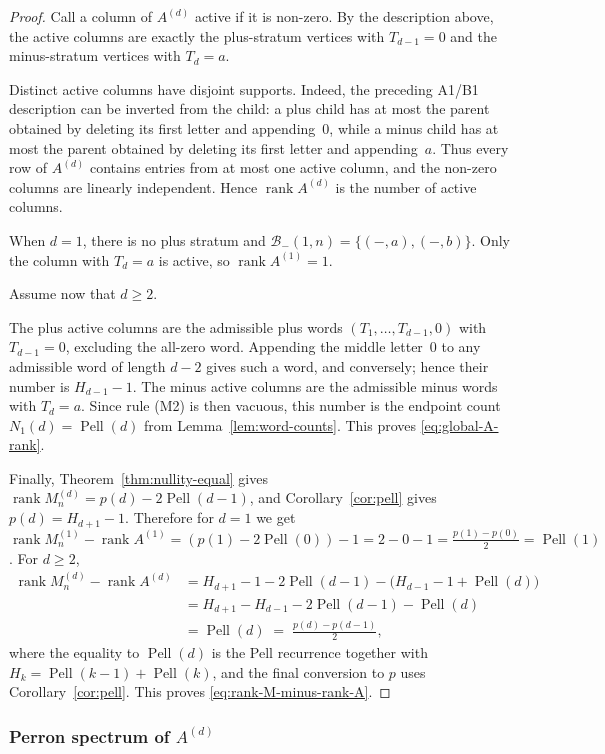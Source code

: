 \documentclass{amsart}
\theoremstyle{definition}
\theoremstyle{remark}
\DeclareMathOperator{\rank}{rank}
\DeclareMathOperator{\Pell}{Pell}
\begin{document}
\begin{proof}
Call a column of $A^{(d)}$ active if it is non-zero.  By the
description above, the active columns are exactly the plus-stratum
vertices with $T_{d-1}=0$ and the minus-stratum vertices with
$T_d=a$.

Distinct active columns have disjoint supports.  Indeed, the
preceding A1/B1 description can be inverted from the child: a
plus child has at most the parent obtained by deleting its first
letter and appending~$0$, while a minus child has at most the
parent obtained by deleting its first letter and appending~$a$.
Thus every row of $A^{(d)}$ contains entries from at most one
active column, and the non-zero columns are linearly independent.
Hence $\rank A^{(d)}$ is the number of active columns.

When $d=1$, there is no plus stratum and
$\mathcal{B}_-(1,n)=\{(-,a),(-,b)\}$.  Only the column with
$T_d=a$ is active, so $\rank A^{(1)}=1$.

Assume now that $d\ge2$.

The plus active columns are the admissible plus words
$(T_1,\ldots,T_{d-1},0)$ with $T_{d-1}=0$, excluding the all-zero
word.  Appending the middle letter~$0$ to any admissible word of
length $d-2$ gives such a word, and conversely; hence their
number is $H_{d-1}-1$.  The minus active columns are the admissible
minus words with $T_d=a$.  Since rule \textup{(M2)} is then
vacuous, this number is the endpoint count $N_1(d)=\Pell(d)$
from Lemma~\ref{lem:word-counts}.  This proves
\eqref{eq:global-A-rank}.

Finally, Theorem~\ref{thm:nullity-equal} gives
$\rank M_n^{(d)}=p(d)-2\Pell(d-1)$, and
Corollary~\ref{cor:pell} gives $p(d)=H_{d+1}-1$.  Therefore
for $d=1$ we get
$\rank M_n^{(1)}-\rank A^{(1)}=(p(1)-2\Pell(0))-1=2-0-1
=\frac{p(1)-p(0)}2=\Pell(1)$.
For $d\ge2$,
\[
\begin{aligned}
  \rank M_n^{(d)} - \rank A^{(d)}
  &= H_{d+1}-1-2\Pell(d-1)
     - \bigl(H_{d-1}-1+\Pell(d)\bigr) \\
  &= H_{d+1}-H_{d-1}-2\Pell(d-1)-\Pell(d) \\
  &= \Pell(d)
   \;=\; \frac{p(d)-p(d{-}1)}2,
\end{aligned}
\]
where the equality to $\Pell(d)$ is the Pell recurrence together with
$H_k=\Pell(k-1)+\Pell(k)$, and the final conversion to $p$ uses
Corollary~\ref{cor:pell}.  This proves
\eqref{eq:rank-M-minus-rank-A}.
\end{proof}

\subsubsection{Perron spectrum of $A^{(d)}$}
\label{sec:A-spectrum}
\end{document}
